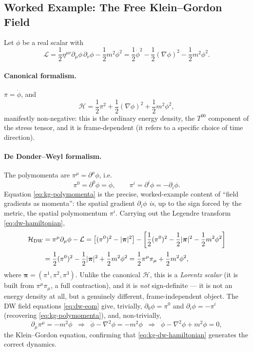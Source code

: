 \documentclass[11pt]{book}
\newcommand{\Lag}{\mathcal{L}}
\newcommand{\Ham}{\mathcal{H}}
\theoremstyle{definition}
\theoremstyle{remark}
\begin{document}
\subsection{Worked Example: The Free Klein--Gordon Field}
\label{sec:kg-example}

Let $\phi$ be a real scalar with
\begin{equation}
\Lag = \frac{1}{2}\eta^{\mu\nu}\partial_\mu\phi\,\partial_\nu\phi - \frac{1}{2}m^2\phi^2
     = \frac{1}{2}\dot\phi^2 - \frac{1}{2}(\nabla\phi)^2 - \frac{1}{2}m^2\phi^2 .
\end{equation}

\paragraph{Canonical formalism.} $\pi=\dot\phi$, and
\begin{equation}
\Ham = \frac{1}{2}\pi^2 + \frac{1}{2}(\nabla\phi)^2 + \frac{1}{2}m^2\phi^2 ,
\end{equation}
manifestly non-negative: this is the ordinary energy density, the $T^{00}$ component of the stress tensor, and it is frame-dependent (it refers to a specific choice of time direction).

\paragraph{De Donder--Weyl formalism.} The polymomenta are $\pi^\mu = \partial^\mu\phi$, i.e.
\begin{equation}
\pi^0 = \partial^0\phi = \dot\phi, \qquad \pi^i = \partial^i\phi = -\partial_i\phi .
\label{eq:kg-polymomenta}
\end{equation}
Equation \eqref{eq:kg-polymomenta} is the precise, worked-example content of ``field gradients as momenta'': the spatial gradient $\partial_i\phi$ \emph{is}, up to the sign forced by the metric, the spatial polymomentum $\pi^i$. Carrying out the Legendre transform \eqref{eq:dw-hamiltonian},
\begin{align}
\Ham_{\mathrm{DW}} &= \pi^\mu\partial_\mu\phi - \Lag
= \big[(\pi^0)^2 - |\boldsymbol\pi|^2\big] - \left[\frac12(\pi^0)^2-\frac12|\boldsymbol\pi|^2-\frac12 m^2\phi^2\right] \notag\\[2pt]
&= \frac{1}{2}(\pi^0)^2 - \frac{1}{2}|\boldsymbol\pi|^2 + \frac{1}{2}m^2\phi^2
= \frac{1}{2}\pi^\mu\pi_\mu + \frac{1}{2}m^2\phi^2 ,
\label{eq:kg-dw-hamiltonian}
\end{align}
where $\boldsymbol\pi=(\pi^1,\pi^2,\pi^3)$. Unlike the canonical $\Ham$, this is a \emph{Lorentz scalar} (it is built from $\pi^\mu\pi_\mu$, a full contraction), and it is \emph{not} sign-definite --- it is not an energy density at all, but a genuinely different, frame-independent object. The DW field equations \eqref{eq:dw-eom} give, trivially, $\partial_0\phi=\pi^0$ and $\partial_i\phi=-\pi^i$ (recovering \eqref{eq:kg-polymomenta}), and, non-trivially,
\begin{equation}
\partial_\mu\pi^\mu = -m^2\phi
\;\;\Longrightarrow\;\;
\ddot\phi - \nabla^2\phi = -m^2\phi
\;\;\Longrightarrow\;\;
\ddot\phi-\nabla^2\phi+m^2\phi = 0,
\end{equation}
the Klein--Gordon equation, confirming that \eqref{eq:kg-dw-hamiltonian} generates the correct dynamics.
\end{document}
